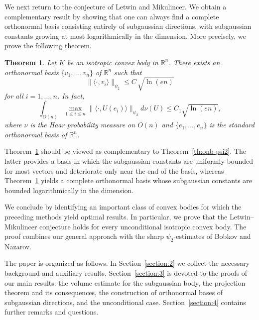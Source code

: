 \documentclass[11pt,leqno]{article}
\newtheorem{theorem}{Theorem}[section]
\theoremstyle{definition}
\numberwithin{equation}{section}
\newcommand{\ls}{\leqslant}
\begin{document}
\smallskip 

We next return to the conjecture of Letwin and Mikulincer. We obtain a complementary result by showing that one can always find a complete orthonormal
basis consisting entirely of subgaussian directions, with subgaussian constants growing at most logarithmically in the dimension. More
precisely, we prove the following theorem.

\begin{theorem}\label{th:partial-onb}Let $K$ be an isotropic convex body in ${\mathbb{R}}^n$. There exists
an orthonormal basis $\{v_1,\ldots ,v_n\}$ of $\mathbb{R}^n$ such that
\begin{equation*}\|\langle \cdot ,v_i\rangle\|_{\psi_2}\ls C\,\sqrt{\ln(en)}\end{equation*}
for all $i=1,\ldots ,n$. In fact,
$$\int_{O(n)}\max_{1\ls i\ls n} \|\langle \cdot,U(e_i)\rangle \|_{\psi_2}d\nu(U)  \ls C_1\sqrt{\ln (en)},$$
where $\nu$ is the Haar probability measure on $O(n)$ and $\{e_1,\ldots ,e_n\}$ is the standard orthonormal basis of $\mathbb{R}^n$.
\end{theorem}

Theorem~\ref{th:partial-onb} should be viewed as complementary to Theorem~\ref{th:onb-psi2}. The latter provides a basis in which the
subgaussian constants are uniformly bounded for most vectors and deteriorate only near the end of the basis, whereas
Theorem~\ref{th:partial-onb} yields a complete orthonormal basis whose subgaussian constants are bounded logarithmically in the dimension.

We conclude by identifying an important class of convex bodies for which the preceding methods yield optimal results. In particular, we prove that the Letwin–Mikulincer conjecture holds for every unconditional isotropic convex body. The proof combines our general approach with the sharp $\psi_2$-estimates of Bobkov and Nazarov.

\smallskip

The paper is organized as follows. In Section~\ref{section:2} we collect the necessary background and auxiliary results. 
Section~\ref{section:3} is devoted to the proofs of our main results: the volume estimate for the subgaussian body, 
the projection theorem and its consequences, the construction of orthonormal bases of subgaussian directions, and the unconditional case.
Section~\ref{section:4} contains further remarks and questions.

\end{document}
